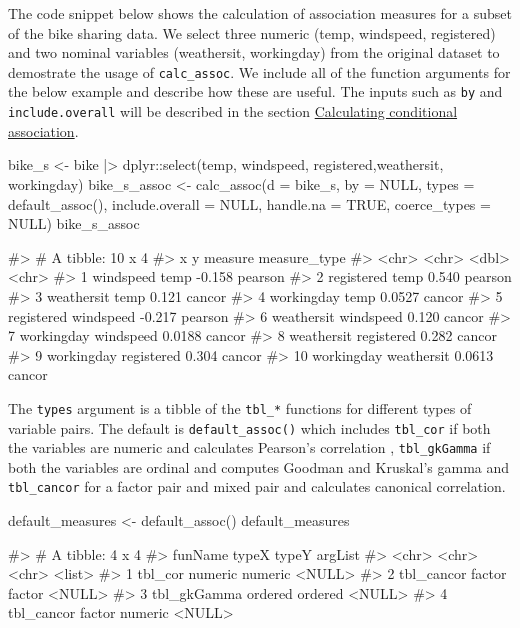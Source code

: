 The code snippet below shows the calculation of association measures for
a subset of the bike sharing data. We select three numeric (temp,
windspeed, registered) and two nominal variables (weathersit,
workingday) from the original dataset to demostrate the usage of
\texttt{calc\_assoc}. We include all of the function arguments for the
below example and describe how these are useful. The inputs such as
\texttt{by} and \texttt{include.overall} will be described in the
section
\protect\hyperlink{calculating-conditional-association}{Calculating
conditional association}.

\begin{Schunk}
\begin{Sinput}
bike_s <- bike |> 
  dplyr::select(temp, windspeed, registered,weathersit, workingday)
bike_s_assoc <- calc_assoc(d = bike_s,
                           by = NULL,
                           types = default_assoc(),
                           include.overall = NULL,
                           handle.na = TRUE,
                           coerce_types = NULL)
bike_s_assoc
\end{Sinput}
\begin{Soutput}
#> # A tibble: 10 x 4
#>    x          y          measure measure_type
#>    <chr>      <chr>        <dbl> <chr>       
#>  1 windspeed  temp       -0.158  pearson     
#>  2 registered temp        0.540  pearson     
#>  3 weathersit temp        0.121  cancor      
#>  4 workingday temp        0.0527 cancor      
#>  5 registered windspeed  -0.217  pearson     
#>  6 weathersit windspeed   0.120  cancor      
#>  7 workingday windspeed   0.0188 cancor      
#>  8 weathersit registered  0.282  cancor      
#>  9 workingday registered  0.304  cancor      
#> 10 workingday weathersit  0.0613 cancor
\end{Soutput}
\end{Schunk}

The \texttt{types} argument is a tibble of the \texttt{tbl\_*} functions
for different types of variable pairs. The default is
\texttt{default\_assoc()} which includes \texttt{tbl\_cor} if both the
variables are numeric and calculates Pearson's correlation ,
\texttt{tbl\_gkGamma} if both the variables are ordinal and computes
Goodman and Kruskal's gamma and \texttt{tbl\_cancor} for a factor pair
and mixed pair and calculates canonical correlation.

\begin{Schunk}
\begin{Sinput}
default_measures <- default_assoc()
default_measures
\end{Sinput}
\begin{Soutput}
#> # A tibble: 4 x 4
#>   funName     typeX   typeY   argList
#>   <chr>       <chr>   <chr>   <list> 
#> 1 tbl_cor     numeric numeric <NULL> 
#> 2 tbl_cancor  factor  factor  <NULL> 
#> 3 tbl_gkGamma ordered ordered <NULL> 
#> 4 tbl_cancor  factor  numeric <NULL>
\end{Soutput}
\end{Schunk}

